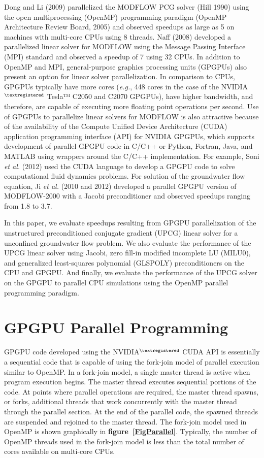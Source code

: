 \documentclass[12pt]{article}
\begin{document}
\color{black}Dong and Li (2009) parallelized the MODFLOW PCG solver (Hill 1990) using the open multiprocessing (OpenMP) programming paradigm (OpenMP Architecture Review Board, 2005) and observed speedups as large as 5 on machines with multi-core CPUs \color{cyan}using 8 threads\color{black}. Naff (2008) developed a parallelized linear solver for MODFLOW using the Message Passing Interface (MPI) standard and observed a speedup of 7 \color{cyan}using 32 CPUs\color{black}. In addition to OpenMP and MPI, general-purpose graphics processing units (GPGPUs) also \color{blue}present \color{black}an option for linear solver parallelization. In comparison to CPUs, GPGPUs \color{blue}typically have more cores (\textit{e.g.}, 448 cores in the case of the NVIDIA$^{\textregistered}$ Tesla™ C2050 and C2070 GPGPUs), have higher bandwidth, and therefore, are capable of executing more floating point operations per second. \color{black}Use of GPGPUs to parallelize linear solvers for MODFLOW is also attractive because of the availability of the Compute Unified Device Architecture (CUDA) application programming interface (API) for NVIDIA GPGPUs, which supports development of parallel GPGPU code in C/C++ or Python, Fortran, Java, and MATLAB using wrappers around the C/C++ implementation. For example, Soni \textit{et al.} (2012) used the CUDA language to develop a GPGPU code to solve computational fluid dynamics problems. For solution of the groundwater flow equation, Ji \textit{et al.} (\color{cyan}2010 and \color{black}2012) developed a parallel GPGPU version of MODFLOW-2000 with a Jacobi preconditioner and observed speedups ranging from 1.8 to 3.7.

In this paper, we evaluate speedups resulting from GPGPU parallelization of the unstructured preconditioned conjugate gradient (UPCG) linear solver for a unconfined groundwater flow problem. We also evaluate the performance of the UPCG linear solver using Jacobi, zero fill-in modified incomplete LU (MILU0), and generalized least-squares polynomial (GLSPOLY) preconditioners on the CPU and GPGPU. And finally, we evaluate the performance of the UPCG solver on the GPGPU to parallel CPU simulations using the OpenMP parallel programming paradigm.

\section* {\bf GPGPU Parallel Programming}
GPGPU code developed using the NVIDIA$^{\textregistered}$ CUDA API is essentially a sequential code that is capable of using the fork-join model of parallel execution similar to OpenMP. In a fork-join model, a single master thread is active when program execution begins. The master thread executes sequential portions of the code. At points where parallel operations are required, the master thread spawns, or forks, additional threads that work concurrently with the master thread through the parallel section. At the end of the parallel code, the spawned threads are suspended and rejoined to the master thread. The fork-join model used in OpenMP is shown graphically in \textbf{figure~\ref{FigParallel}}. Typically, the number of OpenMP threads used in the fork-join model is less than the total number of cores available on multi-core CPUs.
\end{document}
